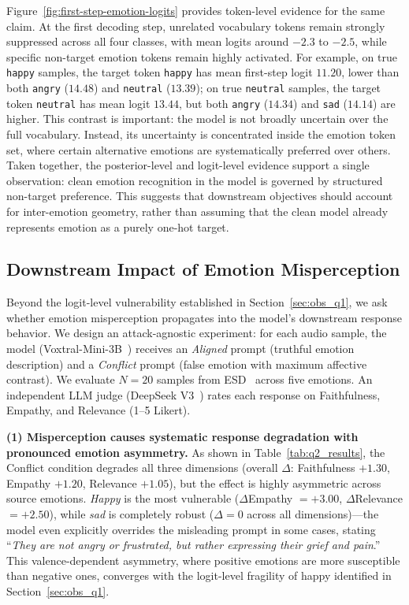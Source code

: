 \documentclass[sigconf]{acmart}
\begin{document}
Figure~\ref{fig:first-step-emotion-logits} provides token-level evidence for the same claim. At the first decoding step, unrelated vocabulary tokens remain strongly suppressed across all four classes, with mean logits around $-2.3$ to $-2.5$, while specific non-target emotion tokens remain highly activated. For example, on true \texttt{happy} samples, the target token \texttt{happy} has mean first-step logit $11.20$, lower than both \texttt{angry} ($14.48$) and \texttt{neutral} ($13.39$); on true \texttt{neutral} samples, the target token \texttt{neutral} has mean logit $13.44$, but both \texttt{angry} ($14.34$) and \texttt{sad} ($14.14$) are higher. This contrast is important: the model is not broadly uncertain over the full vocabulary. Instead, its uncertainty is concentrated inside the emotion token set, where certain alternative emotions are systematically preferred over others. Taken together, the posterior-level and logit-level evidence support a single observation: clean emotion recognition in the model is governed by structured non-target preference. This suggests that downstream objectives should account for inter-emotion geometry, rather than assuming that the clean model already represents emotion as a purely one-hot target.



\subsection{Downstream Impact of Emotion Misperception}
\label{sec:obs_q2}

Beyond the logit-level vulnerability established in Section~\ref{sec:obs_q1}, we ask whether emotion misperception propagates into the model's downstream response behavior. We design an attack-agnostic experiment: for each audio sample, the model (Voxtral-Mini-3B~\cite{voxtral}) receives an \textit{Aligned} prompt (truthful emotion description) and a \textit{Conflict} prompt (false emotion with maximum affective contrast). We evaluate $N = 20$ samples from ESD~\cite{esd} across five emotions. An independent LLM judge (DeepSeek V3~\cite{deepseek}) rates each response on Faithfulness, Empathy, and Relevance (1--5 Likert).

\textbf{(1) Misperception causes systematic response degradation with pronounced emotion asymmetry.}
As shown in Table~\ref{tab:q2_results}, the Conflict condition degrades all three dimensions (overall $\Delta$: Faithfulness $+1.30$, Empathy $+1.20$, Relevance $+1.05$), but the effect is highly asymmetric across source emotions. \textit{Happy} is the most vulnerable ($\Delta$Empathy $= +3.00$, $\Delta$Relevance $= +2.50$), while \textit{sad} is completely robust ($\Delta = 0$ across all dimensions)---the model even explicitly overrides the misleading prompt in some cases, stating ``\textit{They are not angry or frustrated, but rather expressing their grief and pain}.'' This valence-dependent asymmetry, where positive emotions are more susceptible than negative ones, converges with the logit-level fragility of happy identified in Section~\ref{sec:obs_q1}.
\end{document}
